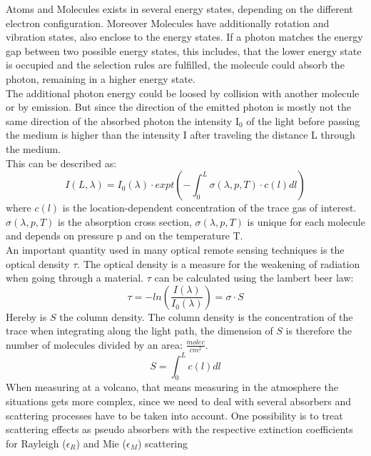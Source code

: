 \documentclass  [
  paper    = a4,
  BCOR     = 10mm,
  twoside,
  fontsize = 12pt,
  fleqn,
  toc      = bibnumbered,
  toc      = listofnumbered,
  numbers  = noendperiod,
  headings = normal,
  listof   = leveldown,
  version  = 3.03
]                                       {scrreprt}
\begin{document}
	Atoms and Molecules exists in several energy states, depending on the different electron configuration. Moreover Molecules have additionally rotation and vibration states, also enclose to the energy states. If a photon matches the energy gap between two possible energy states, this includes, that the lower energy state is occupied and the selection rules are fulfilled, the molecule could absorb the photon, remaining in a higher energy state.\\
	The additional photon energy could be loosed by collision with another molecule or by emission. But since the direction of the emitted photon is mostly not the same direction of the absorbed photon the intensity I$_{0}$ of the light before passing the medium is higher than the intensity I after traveling the distance L through the medium.\\
	This can be described as:\\ 
	\begin{equation}
	I\left(L,\lambda\right) = I_{0}\left(\lambda\right)\cdot expt\left(-\int^{L}_{0}\sigma\left(\lambda,p,T\right)\cdot c\left(l\right)dl\right)
	\end{equation}
	where $c\left(l\right)$ is the location-dependent concentration of the trace gas of interest. $\sigma\left(\lambda,p,T\right)$ is the absorption cross section, $\sigma\left(\lambda,p,T\right)$ is unique for each molecule and depends on pressure p and on the temperature T.\\
	An important quantity used in many optical remote sensing techniques is the optical density $\tau$. The optical density is a measure for the weakening of radiation when going through a material. $\tau$ can be calculated using the lambert beer law:
	\begin{equation}
	\tau = -ln\left(\frac{I\left(\lambda\right)}{I_{0}\left(\lambda\right)}\right) = \sigma\cdot S
	\end{equation}
	Hereby is $S$ the column density. The column density is the concentration of the trace when integrating along the light path, the dimension of $S$ is therefore the number of molecules divided by an area: $\frac{molec}{cm^2}$.
	\begin{equation}
	S = \int_{0}^{L}c\left(l\right)dl
	\end{equation}
	When measuring at a volcano, that means measuring in the atmosphere the situations gets more complex, since we need to deal with several absorbers and scattering processes have to be taken into account. One possibility is to treat scattering effects as pseudo absorbers with the respective extinction coefficients for Rayleigh ($\epsilon_R$) and  Mie ($\epsilon_M$) scattering
\end{document}
